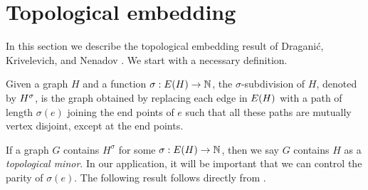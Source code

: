 \documentclass[11pt]{article}
\providecommand{\DIFdelbegin}{} %
\begin{document}




\section{Topological embedding}
\label{sec:embed-machinery}

In this section we describe the topological embedding result of Dragani\'c, Krivelevich, and Nenadov \cite{draganic22rolling}. We start with a necessary definition.

\begin{definition}\label{def:subdivisions}
Given a graph $H$ and a function $\sigma: E(H) \rightarrow \mathbb{N}$, the $\sigma$-subdivision of $H$, denoted by ${H}^{\sigma}$, is the graph obtained by replacing each edge in $E(H)$ with a path of length $\sigma(e)$ joining the end points of $e$ such that all these paths are mutually vertex disjoint, except at the end points.
\end{definition}

If a graph $G$ contains $H^{\sigma}$ for some $\sigma: E(H) \to \mathbb{N}$, then we say $G$ contains $H$ as a \emph{topological minor}. In our application, it will be important that we can control the parity of $\sigma(e)$. The following result follows directly from \cite[Theorem 1]{draganic22rolling}. 


\DIFdelbegin %
\end{document}
